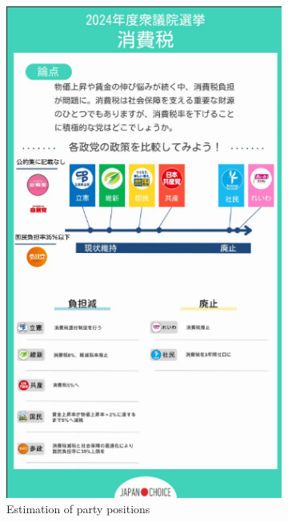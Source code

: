 \documentclass[final,5p,times,twocolumn,authoryear]{elsarticle}
\begin{document}
\begin{figure}[ht]
    \centering
    \begin{subfigure}[t]{0.22\textwidth}
        \centering
        \includegraphics[width=\linewidth]{figs/mielka/consumptiontax.png}
        \caption{Estimation of party positions}
        \label{fig:consumptiontax}
    \end{subfigure}\hfill
    \begin{subfigure}[t]{0.22\textwidth}
        \centering

\end{subfigure}
\end{figure}
\end{document}
